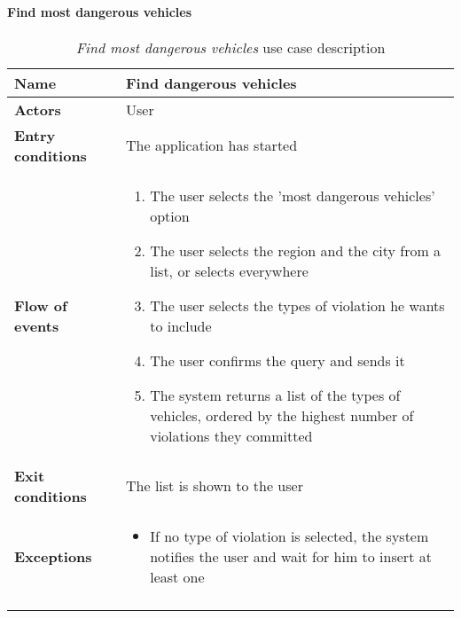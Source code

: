 		\paragraph{Find most dangerous vehicles}
		\begin{longtable}{p{0.25\linewidth}p{0.75\linewidth}}
			\toprule
			\textbf{Name} & \textbf{Find dangerous vehicles} \\
			\midrule
			\textbf{Actors} & User \\
			\midrule
			\textbf{Entry conditions} & The application has started \\
			\midrule
			\textbf{Flow of events} & 
			\begin{enumerate}
				\item The user selects the 'most dangerous vehicles' option
				\item The user selects the region and the city from a list, or selects everywhere
				\item The user selects the types of violation he wants to include
				\item The user confirms the query and sends it
				\item The system returns a list of the types of vehicles, ordered by the highest number of violations they committed
			\end{enumerate} \\
			\midrule
			\textbf{Exit conditions} & The list is shown to the user\\
			\midrule
			\textbf{Exceptions} & 
			\begin{itemize}
				\item 	If no type of violation is selected, the system notifies the user and wait for him to insert at least one	
			\end{itemize} \\
			\bottomrule
			\caption{\emph{Find most dangerous vehicles} use case description}
		\end{longtable}
		
